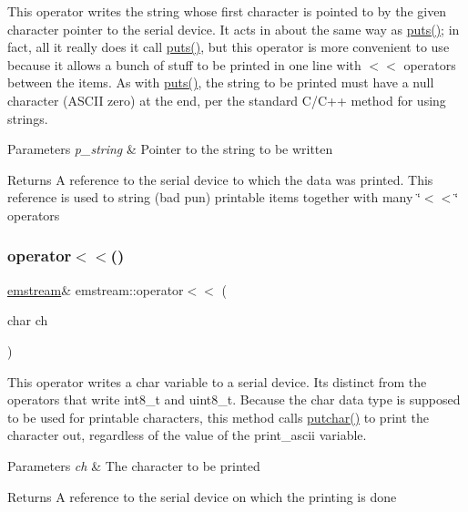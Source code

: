 This operator writes the string whose first character is pointed to by the given character pointer to the serial device. It acts in about the same way as {\ttfamily \mbox{\hyperlink{classemstream_a1ad530cbebe6c54640c1db8c1b9afda2}{puts()}}}; in fact, all it really does it call {\ttfamily \mbox{\hyperlink{classemstream_a1ad530cbebe6c54640c1db8c1b9afda2}{puts()}}}, but this operator is more convenient to use because it allows a bunch of stuff to be printed in one line with {\ttfamily $<$$<$} operators between the items. As with {\ttfamily \mbox{\hyperlink{classemstream_a1ad530cbebe6c54640c1db8c1b9afda2}{puts()}}}, the string to be printed must have a null character (A\+S\+C\+II zero) at the end, per the standard C/\+C++ method for using strings. 
\begin{DoxyParams}{Parameters}
{\em p\+\_\+string} & Pointer to the string to be written \\
\hline
\end{DoxyParams}
\begin{DoxyReturn}{Returns}
A reference to the serial device to which the data was printed. This reference is used to string (bad pun) printable items together with many \char`\"{}$<$$<$\char`\"{} operators 
\end{DoxyReturn}
\mbox{\label{classemstream_a2125b913b6a300c4ac176af247ff5a53}} 
\subsubsection{\texorpdfstring{operator$<$$<$()}{operator<<()}\hspace{0.1cm}{\footnotesize\ttfamily [3/14]}}
{\footnotesize\ttfamily \mbox{\hyperlink{classemstream}{emstream}}\& emstream\+::operator$<$$<$ (\begin{DoxyParamCaption}\item[{char}]{ch }\end{DoxyParamCaption})\hspace{0.3cm}{\ttfamily [inline]}}

This operator writes a {\ttfamily char} variable to a serial device. It\textquotesingle{}s distinct from the operators that write {\ttfamily int8\+\_\+t} and {\ttfamily uint8\+\_\+t}. Because the {\ttfamily char} data type is supposed to be used for printable characters, this method calls {\ttfamily \mbox{\hyperlink{classemstream_aa4dffc9aa58f601cc4153b4cbe65d757}{putchar()}}} to print the character out, regardless of the value of the {\ttfamily print\+\_\+ascii} variable. 
\begin{DoxyParams}{Parameters}
{\em ch} & The character to be printed \\
\hline
\end{DoxyParams}
\begin{DoxyReturn}{Returns}
A reference to the serial device on which the printing is done 
\end{DoxyReturn}
\mbox{\label{classemstream_a8666557b0248286fd70a69d6e0106f4f}} 
